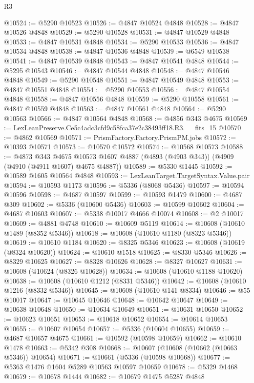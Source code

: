 \begin{lexlean}{R3}
\begin{coremodule}
@10524 := @5290 @10523
@10526 := @4847 @10524 @4848
@10528 := @4847 @10526 @4848
@10529 := @5290 @10528
@10531 := @4847 @10529 @4848
@10533 := @4847 @10531 @4848
@10534 := @5290 @10533
@10536 := @4847 @10534 @4848
@10538 := @4847 @10536 @4848
@10539 := @6549 @10538
@10541 := @4847 @10539 @4848
@10543 := @4847 @10541 @4848
@10544 := @5295 @10543
@10546 := @4847 @10544 @4848
@10548 := @4847 @10546 @4848
@10549 := @5290 @10548
@10551 := @4847 @10549 @4848
@10553 := @4847 @10551 @4848
@10554 := @5290 @10553
@10556 := @4847 @10554 @4848
@10558 := @4847 @10556 @4848
@10559 := @5290 @10558
@10561 := @4847 @10559 @4848
@10563 := @4847 @10561 @4848
@10564 := @5290 @10563
@10566 := @4847 @10564 @4848
@10568 := @4856 @343 @4675
@10569 := LexLeanPreserve.Ce5c4adc3cfd9c58fca37e2c38493ff18.R3.__fits_15
@10570 := @4862 @10569
@10571 := PrismFactory.Factory.PrismPM.jobs
@10572 := @10393 @10571
@10573 := @10570 @10572
@10574 := @10568 @10573
@10588 := @4873
    @343
    @4675
    @10573
    @1607
    @4887
    (@4893 (@4903 @343))
    (@4909 (@4910 (@4911 @1607) @4675 @4887))
@10589 := @5330 @1445
@10592 := @10589 @1605 @10564 @4848
@10593 := LexLeanTarget.TargetSyntax.Value.pair
@10594 := @10593 @1173
@10596 := @5336 (@8068 @5436)
@10597 := @10594 @10596
@10598 := @4687 @10597
@10599 := @10593 @1479
@10600 := @4687 @309
@10602 := @5336 (@10600 @5436)
@10603 := @10599 @10602
@10604 := @4687 @10603
@10607 := @5338 @10017 @4666 @10074
@10608 := @2 @10017
@10609 := @4881 @4748
@10610 := @10609 @5119
@10614 := @10608 (@10610 @1489 (@8352 @5346))
@10618 := @10608 (@10610 @1180 (@8323 @5346))
@10619 := @10610 @1184
@10620 := @8325 @5346
@10623 := @10608 (@10619 (@8324 @10620))
@10624 := @10610 @1518
@10625 := @8330 @5346
@10626 := @8329 @10625
@10627 := @8328 @10626
@10628 := @8327 @10627
@10631 := @10608 (@10624 (@8326 @10628))
@10634 := @10608 (@10610 @1188 @10620)
@10638 := @10608 (@10610 @1212 (@8331 @5346))
@10642 := @10608 (@10610 @1216 (@8332 @5346))
@10645 := @10608 (@10610 @141 @8334)
@10646 := @55 @10017
@10647 := @10645 @10646
@10648 := @10642 @10647
@10649 := @10638 @10648
@10650 := @10634 @10649
@10651 := @10631 @10650
@10652 := @10623 @10651
@10653 := @10618 @10652
@10654 := @10614 @10653
@10655 := @10607 @10654
@10657 := @5336 (@10604 @10655)
@10659 := @4687 @10657 @4675
@10661 := @10592 (@10598 @10659)
@10662 := @10610 @1478
@10663 := @5342 @308
@10668 := @10607 (@10608 (@10662 (@10663 @5346)) @10654)
@10671 := @10661 (@5336 (@10598 @10668))
@10677 := @5363 @1476 @1604 @5289 @10563 @10597 @10659
@10678 := @5329 @1468
@10679 := @10678 @1444
@10682 := @10679 @1475 @5287 @4848

\end{coremodule}
\end{lexlean}
